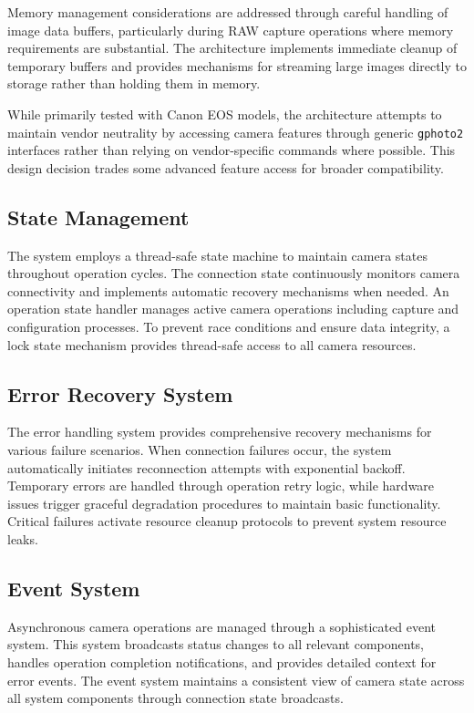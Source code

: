 Memory management considerations are addressed through careful handling of image data buffers, particularly during RAW capture operations where memory requirements are substantial. The architecture implements immediate cleanup of temporary buffers and provides mechanisms for streaming large images directly to storage rather than holding them in memory.

While primarily tested with Canon EOS models, the architecture attempts to maintain vendor neutrality by accessing camera features through generic \texttt{gphoto2} interfaces rather than relying on vendor-specific commands where possible. This design decision trades some advanced feature access for broader compatibility.

\subsection{State Management}
The system employs a thread-safe state machine to maintain camera states throughout operation cycles. The connection state continuously monitors camera connectivity and implements automatic recovery mechanisms when needed. An operation state handler manages active camera operations including capture and configuration processes. To prevent race conditions and ensure data integrity, a lock state mechanism provides thread-safe access to all camera resources.

\subsection{Error Recovery System}
The error handling system provides comprehensive recovery mechanisms for various failure scenarios. When connection failures occur, the system automatically initiates reconnection attempts with exponential backoff. Temporary errors are handled through operation retry logic, while hardware issues trigger graceful degradation procedures to maintain basic functionality. Critical failures activate resource cleanup protocols to prevent system resource leaks.

\subsection{Event System}
Asynchronous camera operations are managed through a sophisticated event system. This system broadcasts status changes to all relevant components, handles operation completion notifications, and provides detailed context for error events. The event system maintains a consistent view of camera state across all system components through connection state broadcasts.

